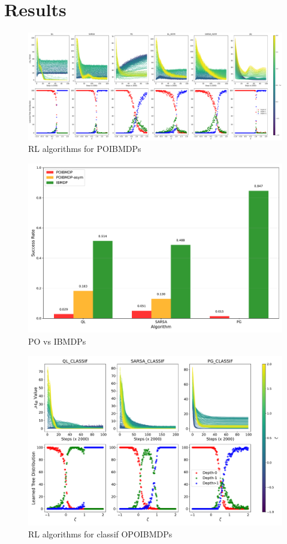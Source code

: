 \section{Results}
\begin{figure}
    \centering
    \includegraphics[width=1\textwidth]{images/images_part1/quick_plot_combined_all.pdf}
    \caption{RL algorithms for POIBMDPs}\label{fig:rl-poibmdp}
\end{figure}
\begin{figure}
    \centering
    \includegraphics[width=1\textwidth]{images/images_part1/algorithm_performance_comparison_flattened.pdf}
    \caption{PO vs IBMDPs}\label{fig:po-vs-ib}
\end{figure}
\begin{figure}
    \centering
    \includegraphics[width=1\textwidth]{images/images_part1/quick_plot_combined_classif.pdf}
    \caption{RL algorithms for classif OPOIBMDPs}\label{fig:rl-poibmdp}
\end{figure}
